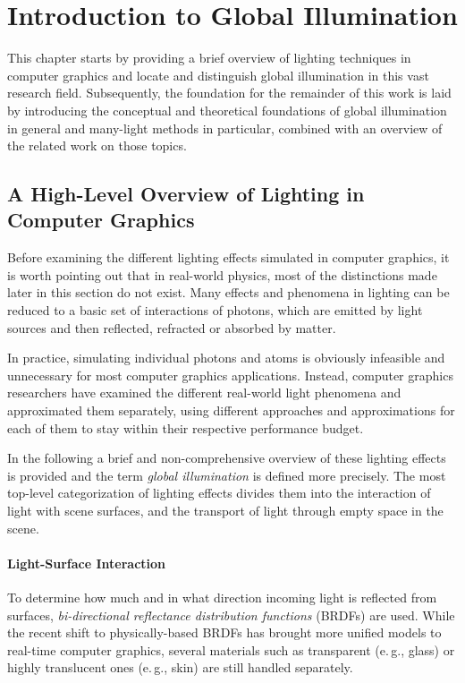 
\chapter{Introduction to Global Illumination}
\label{chap:introductionGI}

This chapter starts by providing a brief overview of lighting techniques in computer graphics and locate and distinguish global illumination in this vast research field.
Subsequently, the foundation for the remainder of this work is laid by introducing the conceptual and theoretical foundations of global illumination in general and many-light methods in particular, combined with an overview of the related work on those topics.


\section{A High-Level Overview of Lighting in Computer Graphics}

Before examining the different lighting effects simulated in computer graphics, it is worth pointing out that in real-world physics, most of the distinctions made later in this section do not exist. Many effects and phenomena in lighting can be reduced to a basic set of interactions of photons, which are emitted by light sources and then reflected, refracted or absorbed by matter.

In practice, simulating individual photons and atoms is obviously infeasible and unnecessary for most computer graphics applications. Instead, computer graphics researchers have examined the different real-world light phenomena and approximated them separately, using different approaches and approximations for each of them to stay within their respective performance budget.

In the following a brief and non-comprehensive overview of these lighting effects is provided and the term \textit{global illumination} is defined more precisely. The most top-level categorization of lighting effects divides them into the interaction of light with scene surfaces, and the transport of light through empty space in the scene.

\subsubsection{Light-Surface Interaction}

To determine how much and in what direction incoming light is reflected from surfaces, \textit{bi-directional reflectance distribution functions} (BRDFs) are used. While the recent shift to physically-based BRDFs has brought more unified models to real-time computer graphics, several materials such as transparent (e.\,g., glass) or highly translucent ones (e.\,g., skin) are still handled separately.


